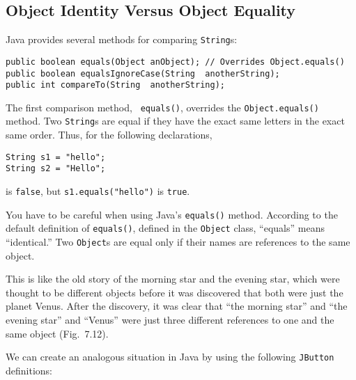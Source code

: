 \subsection{Object Identity Versus Object Equality}
\noindent Java provides several methods for comparing {\tt String}s:

\begin{jjjlisting}
\begin{lstlisting}
public boolean equals(Object anObject); // Overrides Object.equals()
public boolean equalsIgnoreCase(String  anotherString);
public int compareTo(String  anotherString);
\end{lstlisting}
\end{jjjlisting}

\noindent The first comparison method, {\tt
equals()}, overrides the {\tt Object.equals()}
method.  Two {\tt String}s are equal if they have the exact same
letters in the exact same  order.
Thus, for the following declarations,

\begin{jjjlisting}
\begin{lstlisting}
String s1 = "hello";
String s2 = "Hello";
\end{lstlisting}
\end{jjjlisting}

 is {\tt false}, but \verb|s1.equals("hello")|
is {\tt true}.

You have to be careful when using Java's {\tt equals()}
method.  According to the default definition of {\tt equals()}, defined
in the {\tt Object} class, ``equals'' means ``identical.''  Two
{\tt Object}s are equal only if their names are references to the same
object.

This is like the old story of the morning star and the evening star,
which were thought to be different objects before it was discovered
that both were just the planet Venus.  After the discovery, it was
clear that ``the morning star'' and ``the evening star'' and ``Venus'' were
just three different references to one and the same object
(Fig.~7.12).

We can create an analogous situation in Java by using the following
{\tt JButton} definitions:


